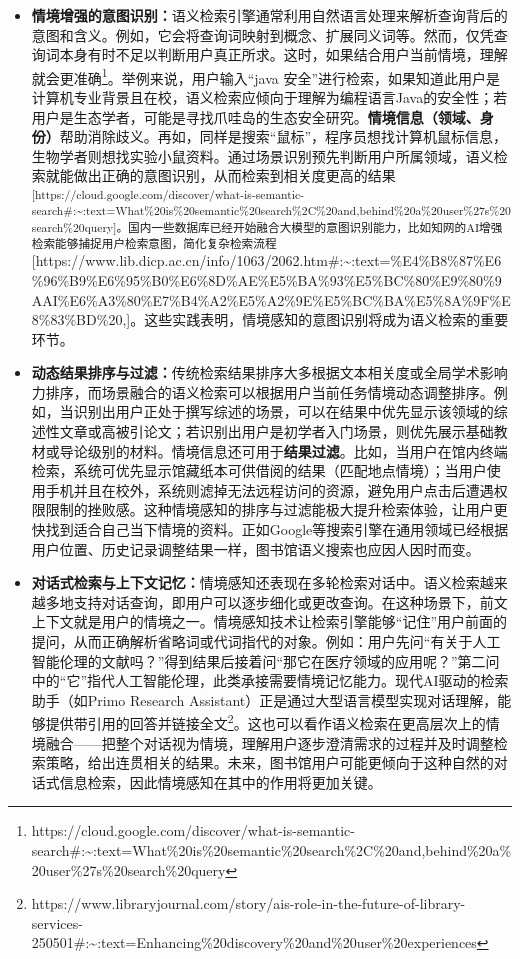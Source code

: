 \documentclass[
  letterpaper,
]{scrbook}
\begin{document}
\begin{itemize}
\item
  \textbf{情境增强的意图识别：}语义检索引擎通常利用自然语言处理来解析查询背后的意图和含义。例如，它会将查询词映射到概念、扩展同义词等。然而，仅凭查询词本身有时不足以判断用户真正所求。这时，如果结合用户当前情境，理解就会更准确\footnote{https://cloud.google.com/discover/what-is-semantic-search\#:\textasciitilde:text=What\%20is\%20semantic\%20search\%2C\%20and,behind\%20a\%20user\%27s\%20search\%20query}。举例来说，用户输入``java
  安全''进行检索，如果知道此用户是计算机专业背景且在校，语义检索应倾向于理解为编程语言Java的安全性；若用户是生态学者，可能是寻找爪哇岛的生态安全研究。\textbf{情境信息（领域、身份）}帮助消除歧义。再如，同样是搜索``鼠标''，程序员想找计算机鼠标信息，生物学者则想找实验小鼠资料。通过场景识别预先判断用户所属领域，语义检索就能做出正确的意图识别，从而检索到相关度更高的结果\textsuperscript{{[}https://cloud.google.com/discover/what-is-semantic-search\#:\textasciitilde:text=What\%20is\%20semantic\%20search\%2C\%20and,behind\%20a\%20user\%27s\%20search\%20query{]}。国内一些数据库已经开始融合大模型的意图识别能力，比如知网的AI增强检索能够捕捉用户检索意图，简化复杂检索流程}{[}https://www.lib.dicp.ac.cn/info/1063/2062.htm\#:\textasciitilde:text=\%E4\%B8\%87\%E6\%96\%B9\%E6\%95\%B0\%E6\%8D\%AE\%E5\%BA\%93\%E5\%BC\%80\%E9\%80\%9AAI\%E6\%A3\%80\%E7\%B4\%A2\%E5\%A2\%9E\%E5\%BC\%BA\%E5\%8A\%9F\%E8\%83\%BD\%20,{]}。这些实践表明，情境感知的意图识别将成为语义检索的重要环节。
\item
  \textbf{动态结果排序与过滤：}传统检索结果排序大多根据文本相关度或全局学术影响力排序，而场景融合的语义检索可以根据用户当前任务情境动态调整排序。例如，当识别出用户正处于撰写综述的场景，可以在结果中优先显示该领域的综述性文章或高被引论文；若识别出用户是初学者入门场景，则优先展示基础教材或导论级别的材料。情境信息还可用于\textbf{结果过滤}。比如，当用户在馆内终端检索，系统可优先显示馆藏纸本可供借阅的结果（匹配地点情境）；当用户使用手机并且在校外，系统则滤掉无法远程访问的资源，避免用户点击后遭遇权限限制的挫败感。这种情境感知的排序与过滤能极大提升检索体验，让用户更快找到适合自己当下情境的资料。正如Google等搜索引擎在通用领域已经根据用户位置、历史记录调整结果一样，图书馆语义搜索也应因人因时而变。
\item
  \textbf{对话式检索与上下文记忆：}情境感知还表现在多轮检索对话中。语义检索越来越多地支持对话查询，即用户可以逐步细化或更改查询。在这种场景下，前文上下文就是用户的情境之一。情境感知技术让检索引擎能够``记住''用户前面的提问，从而正确解析省略词或代词指代的对象。例如：用户先问``有关于人工智能伦理的文献吗？''得到结果后接着问``那它在医疗领域的应用呢？''第二问中的``它''指代人工智能伦理，此类承接需要情境记忆能力。现代AI驱动的检索助手（如Primo
  Research
  Assistant）正是通过大型语言模型实现对话理解，能够提供带引用的回答并链接全文\footnote{https://www.libraryjournal.com/story/ais-role-in-the-future-of-library-services-250501\#:\textasciitilde:text=Enhancing\%20discovery\%20and\%20user\%20experiences}。这也可以看作语义检索在更高层次上的情境融合------把整个对话视为情境，理解用户逐步澄清需求的过程并及时调整检索策略，给出连贯相关的结果。未来，图书馆用户可能更倾向于这种自然的对话式信息检索，因此情境感知在其中的作用将更加关键。
\end{itemize}
\end{document}
